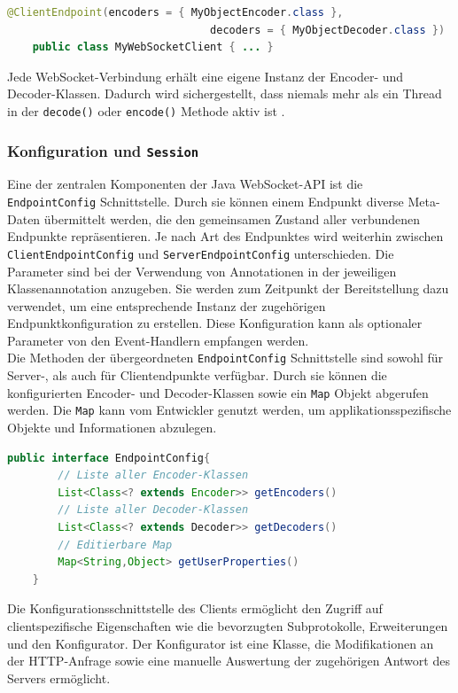\documentclass[11pt,a4paper,titlepage]{scrartcl}
\numberwithin{equation}{section}
\begin{document}
\begin{lstlisting}[frame=single, language=Java, caption=Java: Angabe der Encoder- und Decoder-Klassen]
	@ClientEndpoint(encoders = { MyObjectEncoder.class }, 
								decoders = { MyObjectDecoder.class })
	public class MyWebSocketClient { ... }
\end{lstlisting}

\noindent Jede WebSocket-Verbindung erhält eine eigene Instanz der Encoder- und Decoder-Klassen. Dadurch wird sichergestellt, dass niemals mehr als ein Thread in der \texttt{decode()} oder \texttt{encode()} Methode aktiv ist \autocite[82]{coward_java_2014}. 

\subsubsection{Konfiguration und \texttt{Session}}
Eine der zentralen Komponenten der Java WebSocket-API ist die \texttt{EndpointConfig} Schnittstelle. Durch sie können einem Endpunkt diverse Meta-Daten übermittelt werden, die den gemeinsamen Zustand aller verbundenen Endpunkte repräsentieren. Je nach Art des Endpunktes wird weiterhin zwischen \texttt{ClientEndpointConfig} und \texttt{ServerEndpointConfig} unterschieden. Die Parameter sind bei der Verwendung von Annotationen in der jeweiligen Klassenannotation anzugeben. Sie werden zum Zeitpunkt der Bereitstellung dazu verwendet, um eine entsprechende Instanz der zugehörigen Endpunktkonfiguration zu erstellen. Diese Konfiguration kann als optionaler Parameter von den Event-Handlern empfangen werden.\\

\noindent Die Methoden der übergeordneten \texttt{EndpointConfig} Schnittstelle sind sowohl für Server-, als auch für Clientendpunkte verfügbar. Durch sie können die konfigurierten Encoder- und Decoder-Klassen sowie ein \texttt{Map} Objekt abgerufen werden. Die \texttt{Map} kann vom Entwickler genutzt werden, um applikationsspezifische Objekte und Informationen abzulegen. \medskip

\begin{lstlisting}[frame=single, language=Java, caption=Java: EndpointConfig]
	public interface EndpointConfig{
		// Liste aller Encoder-Klassen
		List<Class<? extends Encoder>> getEncoders()
		// Liste aller Decoder-Klassen
		List<Class<? extends Decoder>> getDecoders()
		// Editierbare Map
		Map<String,Object> getUserProperties()
	}
\end{lstlisting}
\noindent Die Konfigurationsschnittstelle des Clients ermöglicht den Zugriff auf clientspezifische Eigenschaften wie die bevorzugten Subprotokolle, Erweiterungen und den Konfigurator. Der Konfigurator ist eine Klasse, die Modifikationen an der HTTP-Anfrage sowie eine manuelle Auswertung der zugehörigen Antwort des Servers ermöglicht.
\end{document}
